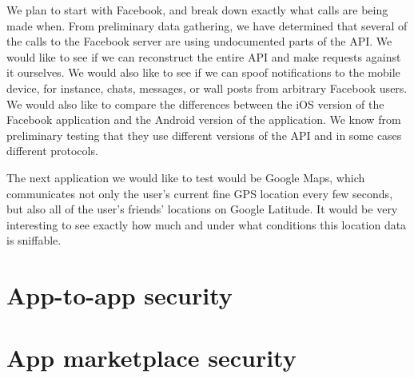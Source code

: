 \documentclass[11pt]{article}
\begin{document}
We plan to start with Facebook, and break down exactly what calls are being made when. From preliminary data gathering, we have determined that several of the calls to the Facebook server are using undocumented parts of the API. We would like to see if we can reconstruct the entire API and make requests against it ourselves. We would also like to see if we can spoof notifications to the mobile device, for instance, chats, messages, or wall posts from arbitrary Facebook users. We would also like to compare the differences between the iOS version of the Facebook application and the Android version of the application. We know from preliminary testing that they use different versions of the API and in some cases different protocols.

The next application we would like to test would be Google Maps, which communicates not only the user's current fine GPS location every few seconds, but also all of the user's friends' locations on Google Latitude. It would be very interesting to see exactly how much and under what conditions this location data is sniffable.

\section{App-to-app security}

\section{App marketplace security}
\end{document}
